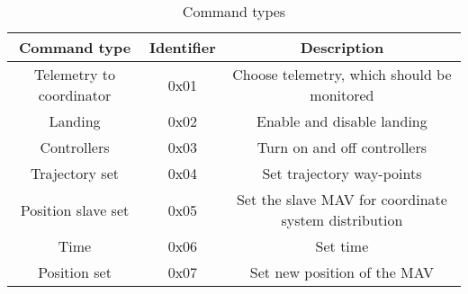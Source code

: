 \begin{table}[H]
\begin{center}
\begin{tabular}{c c c}
\toprule
\rowcolor[HTML]{FFFC9E} 
\textbf{Command type} & \textbf{Identifier} & \textbf{Description} \\ \midrule
Telemetry to coordinator  & 0x01   & Choose telemetry, which should be monitored  \\  [1ex] 
Landing       			  & 0x02   & Enable and disable landing                   \\ [1ex] 
Controllers               & 0x03   & Turn on and off controllers         		  \\ [1ex] 
Trajectory set 			  & 0x04   & Set trajectory way-points				      \\ [1ex] 
Position slave set  	  & 0x05   & Set the slave MAV for coordinate system distribution   \\ [1ex] 
Time  					  & 0x06   & Set time          						      \\ [1ex] 
Position set   			  & 0x07   & Set new position of the MAV  	   	          \\ [1ex] 
 \bottomrule
\end{tabular}
\end{center}
\caption{Command types}
\label{tab:commandTypes}
\end{table}

